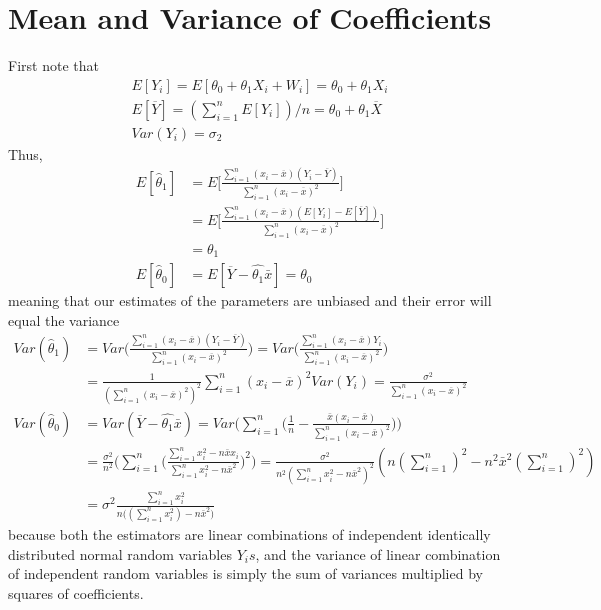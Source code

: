 \documentclass[../probability-notes.tex]{subfiles}
\begin{document}
    \section{Mean and Variance of Coefficients}
    First note that
    \begin{gather*}
        E[Y_{i}] = E[\theta_{0} + \theta_{1}X_{i} + W_{i}] = \theta_{0} + \theta_{1}X_{i}\\
        E[\overline{Y}] = (\sum_{i=1}^{n} E[Y_{i}])/n = \theta_{0} + \theta_{1}\overline{X}\\
        Var(Y_{i}) = \sigma_{2}
    \end{gather*}
    Thus,
    \begin{align*}
        E[\hat{\theta}_{1}] &= E\bigg[ \frac{\sum_{i=1}^{n} (x_{i} - \overline{x}) (Y_{i} - \overline{Y})}{\sum_{i=1}^{n}(x_{i} - \overline{x})^{2}} \bigg]\\ 
        &= E\bigg[ \frac{\sum_{i=1}^{n} (x_{i} - \overline{x}) (E[Y_{i}] - E[\overline{Y}])}{\sum_{i=1}^{n}(x_{i} - \overline{x})^{2}} \bigg]\\
        &= \theta_{1}\\
        E[\hat{\theta}_{0}] &= E[\overline{Y} - \hat{\theta_{1}} \bar{x}] = \theta_{0}
    \end{align*}
    meaning that our estimates of the parameters are unbiased and their error will equal the variance
    \begin{align*}
        Var(\hat{\theta}_{1}) &= Var \bigg( \frac{\sum_{i=1}^{n} (x_{i} - \overline{x}) (Y_{i} - \overline{Y})}{\sum_{i=1}^{n}(x_{i} - \overline{x})^{2}} \bigg)
        = Var \bigg( \frac{\sum_{i=1}^{n} (x_{i} - \overline{x})Y_{i}}{\sum_{i=1}^{n}(x_{i} - \overline{x})^{2}} \bigg)\\
        &= \frac{1}{(\sum_{i=1}^{n}(x_{i} - \overline{x})^{2})^{2}} \sum_{i=1}^{n} (x_{i} - \overline{x})^{2} Var(Y_{i})
        = \frac{\sigma^{2}}{\sum_{i=1}^{n}(x_{i} - \overline{x})^{2}}\\
        Var(\hat{\theta}_{0}) &= Var(\overline{Y} - \hat{\theta_{1}} \bar{x})
        = Var \bigg( \sum_{i=1}^{n} \bigg( \frac{1}{n} - \frac{\bar{x}(x_{i} - \bar{x})}{\sum_{i=1}^{n}(x_{i} - \bar{x})^{2}} \bigg) \bigg)\\
        &= \frac{\sigma^{2}}{n^{2}} \bigg( \sum_{i=1}^{n} \bigg( \frac{\sum_{i=1}^{n}x_{i}^{2} - n\bar{x}x_{i}}{\sum_{i=1}^{n}x_{i}^{2} - n\bar{x}^{2}} \bigg)^{2} \bigg)
        = \frac{\sigma^{2}}{n^{2} (\sum_{i=1}^{n}x_{i}^{2} - n\bar{x}^{2})^{2}} (n(\sum_{i=1}^{n})^{2} - n^{2}\bar{x}^{2}(\sum_{i=1}^{n})^{2})\\
        &= \sigma^{2} \frac{\sum_{i=1}^{n} x_{i}^{2}}{n\big((\sum_{i=1}^{n} x_{i}^{2}) - n\bar{x}^{2} \big)}
    \end{align*}
    because both the estimators are linear combinations of independent identically distributed normal random variables $Y_{i}s$, and the variance of linear combination of independent random variables is simply the sum of variances multiplied by squares of coefficients.\newline
\end{document}
